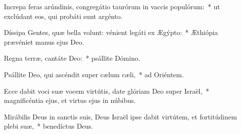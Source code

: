 \item Increpa feras arúndinis, congregátio taurórum in vaccis populórum:~* ut exclúdant eos, qui probáti sunt argénto.

\item Díssipa Gentes, quæ bella volunt: vénient legáti ex Ægýpto:~* Æthiópia prævéniet manus ejus Deo.

\item Regna terræ, cantáte Deo:~* psállite Dómino.

\item Psállite Deo, qui ascéndit super cælum cæli,~* ad Oriéntem.

\item Ecce dabit voci suæ vocem virtútis, date glóriam Deo super Israël,~* magnificéntia ejus, et virtus ejus in núbibus.

\item Mirábilis Deus in sanctis suis, Deus Israël ipse dabit virtútem, et fortitúdinem plebi suæ,~* benedíctus Deus.

